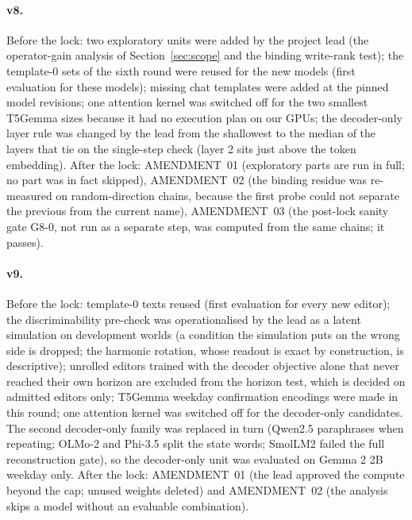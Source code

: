 \paragraph{v8.}
Before the lock: two exploratory units were added by the project lead (the operator-gain analysis of Section~\ref{sec:scope} and the
binding write-rank test); the template-0 sets of the sixth round were reused for the new models (first evaluation for these models);
missing chat templates were added at the pinned model revisions; one attention kernel was switched off for the two smallest T5Gemma sizes
because it had no execution plan on our GPUs; the decoder-only layer rule was changed by the lead from the shallowest to the median of the
layers that tie on the single-step check (layer 2 sits just above the token embedding). After the lock: AMENDMENT~01 (exploratory parts
are run in full; no part was in fact skipped), AMENDMENT~02 (the binding residue was re-measured on random-direction chains, because the
first probe could not separate the previous from the current name), AMENDMENT~03 (the post-lock sanity gate G8-0, not run as a separate
step, was computed from the same chains; it passes).

\paragraph{v9.}
Before the lock: template-0 texts reused (first evaluation for every new editor); the discriminability pre-check was operationalised by the
lead as a latent simulation on development worlds (a condition the simulation puts on the wrong side is dropped; the harmonic rotation,
whose readout is exact by construction, is descriptive); unrolled editors trained with the decoder objective alone that never reached their
own horizon are excluded from the horizon test, which is decided on admitted editors only; T5Gemma weekday confirmation encodings were made
in this round; one attention kernel was switched off for the decoder-only candidates. The second decoder-only family was replaced in turn
(Qwen2.5 paraphrases when repeating; OLMo-2 and Phi-{3.5} split the state words; SmolLM2 failed the full reconstruction gate), so the
decoder-only unit was evaluated on Gemma 2 2B weekday only. After the lock: AMENDMENT~01 (the lead approved the compute beyond the cap;
unused weights deleted) and AMENDMENT~02 (the analysis skips a model without an evaluable combination).
